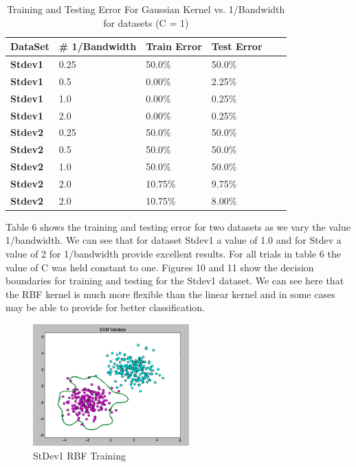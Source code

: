 \documentclass[pageno]{jpaper}
\begin{document}
\begin{table}[h!]
  \centering
  \begin{tabular}{llllll|}
    \hline
     \textbf{DataSet} &\textbf{\# 1/Bandwidth}  & \textbf{Train Error}  & \textbf{Test Error} \\
    \hline
    \hline

  \textbf{Stdev1} 	&0.25 &50.0\% & 50.0\%  \\
 \hline
  \textbf{Stdev1} 	&0.5 &0.00\% &2.25\%  \\
 \hline
  \textbf{Stdev1} 	&1.0 &0.00\% &0.25\%  \\
 \hline
   \textbf{Stdev1} 	&2.0 &0.00\% &0.25\%  \\
 \hline
  \textbf{Stdev2} 	&0.25 &50.0\% & 50.0\%  \\
 \hline
  \textbf{Stdev2} 	&0.5 &50.0\% &50.0\%  \\
 \hline
  \textbf{Stdev2} 	&1.0 &50.0\% &50.0\%  \\
 \hline
  \textbf{Stdev2} 	&2.0 &10.75\% &9.75\%  \\
   \hline
  \textbf{Stdev2} 	&2.0 &10.75\% &8.00\%  \\
  
 \hline
 \end{tabular}
  \caption{Training and Testing Error For Gaussian Kernel vs. 1/Bandwidth for datasets (C = 1)}
  \label{table:formatting}
\end{table}

Table 6 shows the training and testing error for two datasets as we vary the value 1/bandwidth. We can see that for dataset Stdev1 a value of 1.0 and for Stdev a value of 2 for 1/bandwidth provide excellent results. For all trials in table 6 the value of C was held constant to one. Figures 10 and 11 show the decision boundaries for training and testing for the Stdev1 dataset. We can see here that the RBF kernel is much more flexible than the linear kernel and in some cases may be able to provide for better classification.

\begin{figure}[ht!]
\centering
\includegraphics[width=60mm]{stdev1_gauss_train}
\caption{StDev1 RBF Training}
\label{overflow}
\end{figure}
\end{document}

